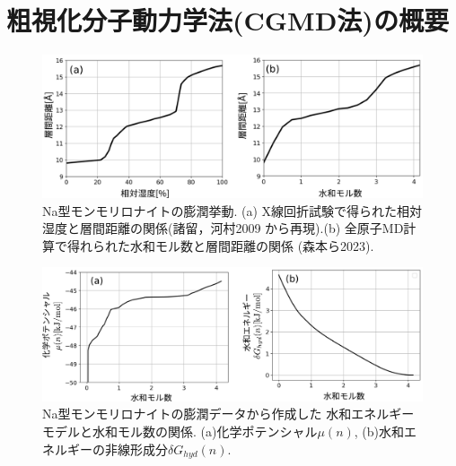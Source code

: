﻿\section{粗視化分子動力学法(CGMD法)の概要}
\begin{figure}[h]
	\begin{center}
	\includegraphics[width=1.0\linewidth]{Figs/fig1.pdf} 
	\end{center}
	\caption{
		Na型モンモリロナイトの膨潤挙動.
		(a) X線回折試験で得られた相対湿度と層間距離の関係(諸留，河村2009\cite{Morodome}
		から再現).(b) 全原子MD計算で得れられた水和モル数と層間距離の関係
		(森本ら2023\cite{Morimoto}). 
	} 
	\label{fig:fig1}
\end{figure}
\begin{figure}[h]
	\begin{center}
	\includegraphics[width=1.0\linewidth]{Figs/fig2.pdf} 
	\end{center}
	\caption{
		Na型モンモリロナイトの膨潤データから作成した
		水和エネルギーモデルと水和モル数の関係.
		(a)化学ポテンシャル$\mu(n)$, (b)水和エネルギーの非線形成分$\delta G_{hyd}(n)$.
	} 
	\label{fig:fig2}
\end{figure}
